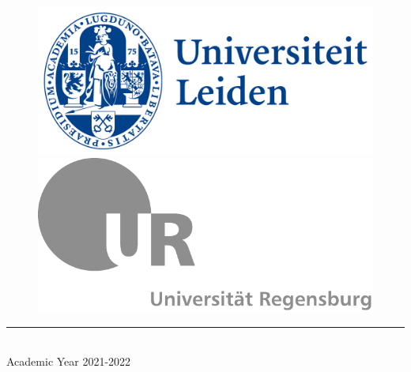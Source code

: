 \begin{titlepage}
\begin{center}
    \begin{figure}[h!]
      \centering
      \begin{minipage}{0.5\linewidth}
        \centering
        \includegraphics[width=0.9\linewidth]{logos/leiden_logo}
      \end{minipage}\hfill
      \begin{minipage}{0.5\linewidth}
        \centering
        \includegraphics[width=0.9\linewidth]{logos/regensburg_logo}
      \end{minipage}
    \end{figure}
    \rule{\linewidth}{0.2mm}\\
    \small{Academic Year 2021-2022}
  \end{center}
\end{titlepage}
